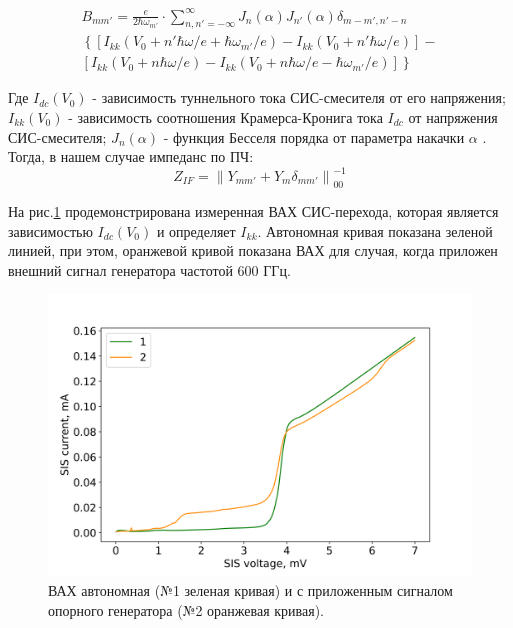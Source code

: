 \documentclass[a4paper]{article}
\begin{document}
\begin{equation}
    \begin{split}
        B_{mm\prime} = \frac{e}{2 \hbar \omega_{m\prime}} \cdot 
        \sum_{n,n\prime=-\infty}^{\infty} J_n(\alpha) J_{n\prime}(\alpha) \delta_{m-m\prime, n\prime-n} \\
        \left\{ \left[ I_{kk}(V_0+n\prime \hbar \omega /e + \hbar \omega_{m\prime}/e) - 
        I_{kk}(V_0 + n\prime \hbar \omega/e) \right] - \right. \\
        \left. \left[ I_{kk}(V_0 + n\hbar \omega/e) - 
        I_{kk}(V_0 + n \hbar \omega/e - \hbar \omega_{m\prime}/e) \right]  \right\}
    \end{split}
\end{equation}

Где $I_{dc}(V_0)$ - зависимость туннельного тока СИС-смесителя от его напряжения; $I_{kk}(V_0)$ - зависимость соотношения Крамерса-Кронига тока $I_{dc}$ от напряжения СИС-смесителя; 
$J_n(\alpha)$ - функция Бесселя порядка  от параметра накачки $\alpha$ .
Тогда, в нашем случае импеданс по ПЧ:
\begin{equation}
    Z_{IF} = \left \| Y_{mm'} + Y_{m} \delta_{mm'} \right \|^{-1}_{00} 
\end{equation}

На рис.\ref{pic-IV} продемонстрирована измеренная ВАХ СИС-перехода, которая является зависимостью $I_{dc}(V_0)$ и определяет $I_{kk}$. 
Автономная кривая показана зеленой линией, при этом, оранжевой кривой показана ВАХ для случая, когда приложен внешний сигнал генератора частотой 600 ГГц. 

\begin{figure}[H]
    \begin{center}
        \includegraphics[scale=0.5]{IV.png}
        \caption{ВАХ автономная (№1 зеленая кривая) и с приложенным сигналом опорного генератора (№2 оранжевая кривая).}
        \label{pic-IV}
    \end{center}
\end{figure}
\end{document}
